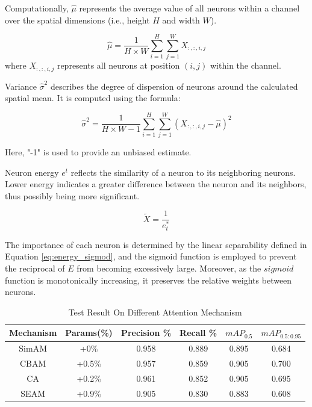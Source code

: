 \documentclass[aic]{iosart2x}
\begin{document}
Computationally, $\hat{\mu}$ represents the average value of all neurons within a channel over the spatial dimensions (i.e., height $H$ and width $W$). 

\begin{equation}
    \hat{\mu} = \frac{1}{H \times W} \sum_{i=1}^{H} \sum_{j=1}^{W} X_{:, :, i, j}
\end{equation}
where $X_{:, :, i, j}$ represents all neurons at position $(i, j)$ within the channel.

Variance $\hat{\sigma}^2$ describes the degree of dispersion of neurons around the calculated spatial mean. It is computed using the formula: 

\begin{equation}
\hat{\sigma}^2 = \frac{1}{H \times W - 1} \sum_{i=1}^{H} \sum_{j=1}^{W} (X_{:, :, i, j} - \hat{\mu})^2
\end{equation} 

Here, "-1" is used to provide an unbiased estimate.

Neuron energy $e^t$ reflects the similarity of a neuron to its neighboring neurons. Lower energy indicates a greater difference between the neuron and its neighbors, thus possibly being more significant. 

\begin{equation}
    \tilde{X} = \frac{1}{e_t^{*}} \label{eq:energy_sigmod}
\end{equation}

The importance of each neuron is determined by the linear separability defined in Equation \ref{eq:energy_sigmod}, and the sigmoid function is employed to prevent the reciprocal of $E$ from becoming excessively large. Moreover, as the $sigmoid$ function is monotonically increasing, it preserves the relative weights between neurons.

\begin{table}[!htbp]
    \caption{Test Result On Different Attention Mechanism}
    \label{tab:SimAM_effect}
    \centering
    \begin{tabular}{cccccc}
        \toprule
 Mechanism & Params(\%) & Precision \% & Recall \% & $mAP_{0.5}$ & $mAP_{0.5:0.95} $ \\ \midrule       
 SimAM     & +0\%       & 0.958        & 0.889     & 0.895       & 0.684             \\      
 CBAM      & +0.5\%     & 0.957        & 0.859     & 0.905       & 0.700             \\       
 CA        & +0.2\%     & 0.961        & 0.852     & 0.905       & 0.695             \\      
 SEAM      & +0.9\%     & 0.905        & 0.830     & 0.883       & 0.608             \\\bottomrule    
    \end{tabular}
\end{table}
\end{document}
